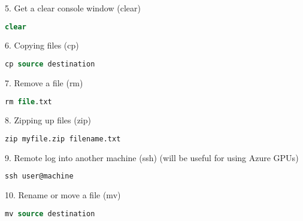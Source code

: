 \documentclass[10pt,landscape]{article}
\begin{document}
\begin{multicols}{2}
5. Get a clear console window (clear)
\begin{lstlisting}[language=SQL]
    clear
\end{lstlisting}

6. Copying files (cp)
\begin{lstlisting}[language=SQL]
    cp source destination
\end{lstlisting}

7. Remove a file (rm)
\begin{lstlisting}[language=SQL]
    rm file.txt
\end{lstlisting}

8. Zipping up files (zip)
\begin{lstlisting}[language=SQL]
    zip myfile.zip filename.txt
\end{lstlisting}

9. Remote log into another machine (ssh) (will be useful for using Azure GPUs)
\begin{lstlisting}[language=SQL]
    ssh user@machine
\end{lstlisting}

10. Rename or move a file (mv)
\begin{lstlisting}[language=SQL]
    mv source destination 
\end{lstlisting}


\end{multicols}
\end{document}
